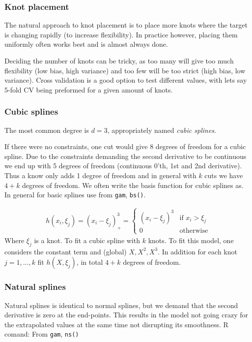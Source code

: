 \documentclass{article}
\begin{document}
\subsubsection{Knot placement}

The natural approach to knot placement is to place more knots where the target is changing rapidly (to increase flexibility). In practice however, placing them uniformly often works best and is almost always done. 

Deciding the number of knots can be tricky, as too many will give too much flexibility (low bias, high variance) and too few will be too strict (high bias, low variance). Cross validation is a good option to test different values, with lets say 5-fold CV being preformed for a given amount of knots. 

\subsubsection{Cubic splines}
The most common degree is $d=3$, appropriately named \textit{cubic splines}. 

If there were no constraints, one cut would give 8 degrees of freedom for a cubic spline. Due to the constraints demanding the second derivative to be continuous we end up with 5 degrees of freedom (continuous 0'th, 1st and 2nd derivative). Thus a know only adds 1 degree of freedom and in general with $k$ cuts we have $4+k$ degrees of freedom. We often write the basis function for cubic splines as. In general for basic splines use from \texttt{gam}, \texttt{bs()}.

\begin{align*}
    h(x_i, \xi_j) = (x_i-\xi_j)^3_+ = \left\{
	\begin{array}{ll}
		(x_i-\xi_j)^3  & \mbox{if } x_i > \xi_j \\
		0 &  \text{otherwise}
	\end{array}
\right.
\end{align*}
Where $\xi_j$ is a knot. To fit a cubic spline with $k$ knots. To fit this model, one considers the constant term and (global) $X, X^2, X^3$. In addition for each knot $j = 1, ..., k$ fit $h(X, \xi_j)$, in total $4+k$ degrees of freedom. 


\subsubsection{Natural splines}
Natural splines is identical to normal splines, but we demand that the second derivative is zero at the end-points. This results in the model not going crazy for the extrapolated values at the same time not disrupting its smoothness. R comand: From \texttt{gam}, \texttt{ns()}
\end{document}
